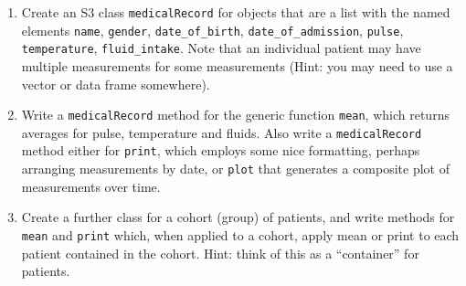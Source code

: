 \documentclass[]{article}
\begin{document}
\begin{enumerate}[1.]
\item
  Create an S3 class \texttt{medicalRecord} for objects that are a list
  with the named elements \texttt{name}, \texttt{gender},
  \texttt{date\_of\_birth}, \texttt{date\_of\_admission},
  \texttt{pulse}, \texttt{temperature}, \texttt{fluid\_intake}. Note
  that an individual patient may have multiple measurements for some
  measurements (Hint: you may need to use a vector or data frame
  somewhere).
\item
  Write a \texttt{medicalRecord} method for the generic function
  \texttt{mean}, which returns averages for pulse, temperature and
  fluids. Also write a \texttt{medicalRecord} method either for
  \texttt{print}, which employs some nice formatting, perhaps arranging
  measurements by date, or \texttt{plot} that generates a composite plot
  of measurements over time.
\item
  Create a further class for a cohort (group) of patients, and write
  methods for \texttt{mean} and \texttt{print} which, when applied to a
  cohort, apply mean or print to each patient contained in the cohort.
  Hint: think of this as a ``container'' for patients.
\end{enumerate}
\end{document}
